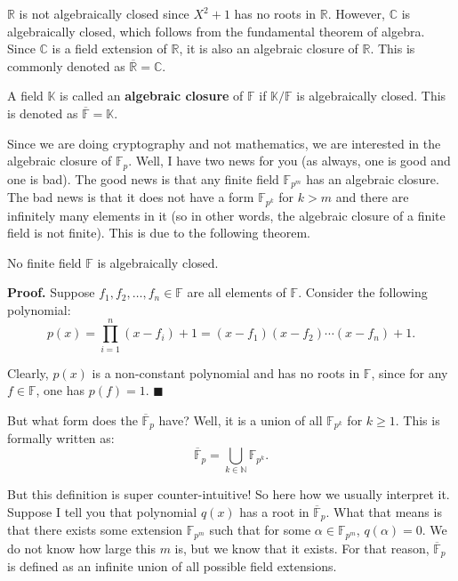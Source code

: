 \documentclass[../lecture-notes.tex]{subfiles}
\begin{document}
\begin{example}
    $\mathbb{R}$ is not algebraically closed since $X^2+1$ has no roots in $\mathbb{R}$. However, $\mathbb{C}$ is algebraically closed, which follows from the fundamental theorem of algebra. Since $\mathbb{C}$ is a field extension of $\mathbb{R}$, it is also an algebraic closure of $\mathbb{R}$. This is commonly denoted as $\overline{\mathbb{R}} = \mathbb{C}$.
\end{example}

\begin{definition}
    A field $\mathbb{K}$ is called an \textbf{algebraic closure} of $\mathbb{F}$ if $\mathbb{K}/\mathbb{F}$ is algebraically closed. This is denoted as $\overline{\mathbb{F}} = \mathbb{K}$.
\end{definition}

Since we are doing cryptography and not mathematics, we are interested in the algebraic closure of $\mathbb{F}_p$. Well, I have two news for you (as always, one is good and one is bad). The good news is that any finite field $\mathbb{F}_{p^m}$ has an algebraic closure. The bad news is that it does not have a form $\mathbb{F}_{p^k}$ for $k>m$ and there are infinitely many elements in it (so in other words, the algebraic closure of a finite field is not finite). This is due to the following theorem.

\begin{theorem}
    No finite field $\mathbb{F}$ is algebraically closed.
\end{theorem}

\textbf{Proof.} Suppose $f_1,f_2,\dots,f_n \in \mathbb{F}$ are all elements of $\mathbb{F}$. Consider the following polynomial:
\begin{equation*}
    p(x) = \prod_{i=1}^n (x-f_i)+1 = (x-f_1)(x-f_2)\cdots(x-f_n)+1.
\end{equation*}

Clearly, $p(x)$ is a non-constant polynomial and has no roots in $\mathbb{F}$, since for any $f \in \mathbb{F}$, one has $p(f)=1$. $\blacksquare$

But what form does the $\overline{\mathbb{F}}_{p}$ have? Well, it is a union of all $\mathbb{F}_{p^k}$ for $k \geq 1$. This is formally written as:
\begin{equation*}
    \overline{\mathbb{F}}_{p} = \bigcup_{k \in \mathbb{N}} \mathbb{F}_{p^k}.
\end{equation*} 

\begin{remark}
    But this definition is super counter-intuitive! So here how we usually interpret it. Suppose I tell you that polynomial $q(x)$ has a root in $\overline{\mathbb{F}}_p$. What that means is that there exists some extension $\mathbb{F}_{p^m}$ such that for some $\alpha \in \mathbb{F}_{p^m}$, $q(\alpha)=0$. We do not know how large this $m$ is, but we know that it exists. For that reason, $\overline{\mathbb{F}}_p$ is defined as an infinite union of all possible field extensions.
\end{remark}
\end{document}
